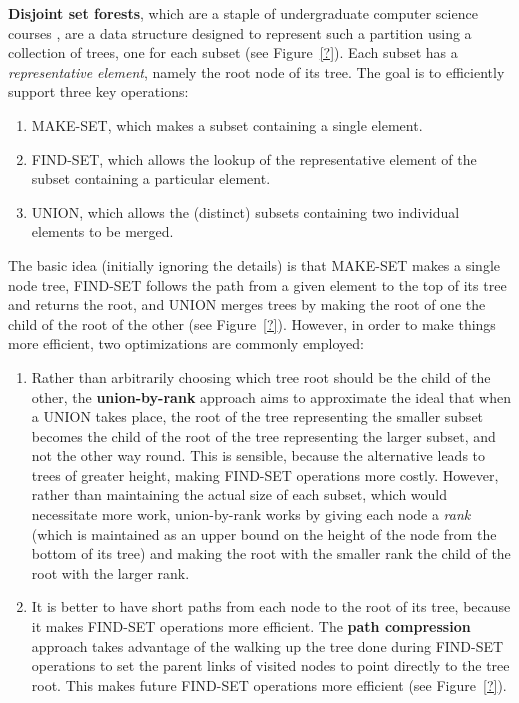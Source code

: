 \noindent \textbf{Disjoint set forests}, which are a staple of undergraduate computer science courses \cite{worrell06}, are a data structure designed to represent such a partition using a collection of trees, one for each subset (see Figure~\ref{?}). Each subset has a \emph{representative element}, namely the root node of its tree. The goal is to efficiently support three key operations:
%
\begin{enumerate}

\item MAKE-SET, which makes a subset containing a single element.
\item FIND-SET, which allows the lookup of the representative element of the subset containing a particular element.
\item UNION, which allows the (distinct) subsets containing two individual elements to be merged.

\end{enumerate}
%
The basic idea (initially ignoring the details) is that MAKE-SET makes a single node tree, FIND-SET follows the path from a given element to the top of its tree and returns the root, and UNION merges trees by making the root of one the child of the root of the other (see Figure~\ref{?}). However, in order to make things more efficient, two optimizations are commonly employed:
%
\begin{enumerate}

\item Rather than arbitrarily choosing which tree root should be the child of the other, the \textbf{union-by-rank} approach aims to approximate the ideal that when a UNION takes place, the root of the tree representing the smaller subset becomes the child of the root of the tree representing the larger subset, and not the other way round. This is sensible, because the alternative leads to trees of greater height, making FIND-SET operations more costly. However, rather than maintaining the actual size of each subset, which would necessitate more work, union-by-rank works by giving each node a \emph{rank} (which is maintained as an upper bound on the height of the node from the bottom of its tree) and making the root with the smaller rank the child of the root with the larger rank.

\item It is better to have short paths from each node to the root of its tree, because it makes FIND-SET operations more efficient. The \textbf{path compression} approach takes advantage of the walking up the tree done during FIND-SET operations to set the parent links of visited nodes to point directly to the tree root. This makes future FIND-SET operations more efficient (see Figure~\ref{?}).

\end{enumerate}

